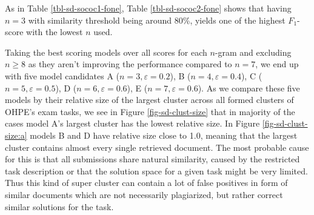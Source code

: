 \begin{table}[ht]
\centering
\caption{$F_1$-score for SOCO-C2, which contains 28 cases of plagiarism.}
\label{tbl-sd-sococ2-fone}
\end{table}

\noindent
As in Table \ref{tbl-sd-sococ1-fone}, Table \ref{tbl-sd-sococ2-fone} shows that having $n=3$ with similarity threshold being around 80\%, yields one of the highest $F_1$-score with the lowest $n$ used. 

Taking the best scoring models over all scores for each $n$-gram and excluding $n \geq 8$ as they aren't improving the performance compared to $n=7$, we end up with five model candidates A ($n=3, \varepsilon=0.2$), B ($n=4, \varepsilon=0.4$), C ($n=5, \varepsilon=0.5$), D ($n=6, \varepsilon=0.6$), E ($n=7, \varepsilon=0.6$). As we compare these five models by their relative size of the largest cluster across all formed clusters of OHPE's exam tasks, we see in Figure \ref{fig-sd-clust-size} that in majority of the cases model A's largest cluster has the lowest relative size. In Figure \ref{fig-sd-clust-size:a} models B and D have relative size close to 1.0, meaning that the largest cluster contains almost every single retrieved document. The most probable cause for this is that all submissions share natural similarity, caused by the restricted task description or that the solution space for a given task might be very limited. Thus this kind of super cluster can contain a lot of false positives in form of similar documents which are not necessarily plagiarized, but rather correct similar solutions for the task.

